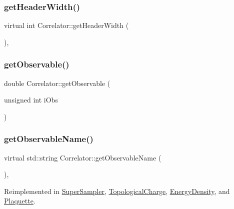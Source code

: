 \mbox{\label{class_correlator_a76375274cb578f48b9d51489ca8cd503}} 
\subsubsection{\texorpdfstring{getHeaderWidth()}{getHeaderWidth()}}
{\footnotesize\ttfamily virtual int Correlator\+::get\+Header\+Width (\begin{DoxyParamCaption}{ }\end{DoxyParamCaption})\hspace{0.3cm}{\ttfamily [inline]}, {\ttfamily [virtual]}}

\mbox{\label{class_correlator_aada8184c033e0465f540a368465c9ba5}} 
\subsubsection{\texorpdfstring{getObservable()}{getObservable()}}
{\footnotesize\ttfamily double Correlator\+::get\+Observable (\begin{DoxyParamCaption}\item[{unsigned int}]{i\+Obs }\end{DoxyParamCaption})\hspace{0.3cm}{\ttfamily [virtual]}}

\mbox{\label{class_correlator_ad1fa59e864917c3e48da037f90c3488f}} 
\subsubsection{\texorpdfstring{getObservableName()}{getObservableName()}}
{\footnotesize\ttfamily virtual std\+::string Correlator\+::get\+Observable\+Name (\begin{DoxyParamCaption}{ }\end{DoxyParamCaption})\hspace{0.3cm}{\ttfamily [inline]}, {\ttfamily [virtual]}}



Reimplemented in \mbox{\hyperlink{class_super_sampler_a84d3ba9a56dd2a36cb11d495c32f5ca6}{Super\+Sampler}}, \mbox{\hyperlink{class_topological_charge_ad12d246692f3d9ea0ef591814010ef88}{Topological\+Charge}}, \mbox{\hyperlink{class_energy_density_a59b320595bca439333d36e3753ca07f0}{Energy\+Density}}, and \mbox{\hyperlink{class_plaquette_a86de9d267ae1bc6a8c6d3335837ea683}{Plaquette}}.

